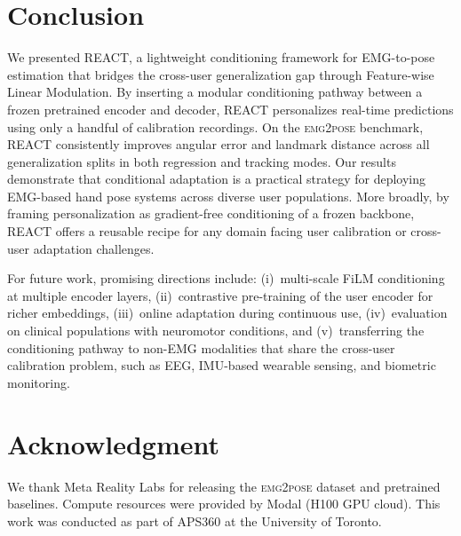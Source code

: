 \documentclass[conference]{IEEEtran}
\begin{document}
\section{Conclusion}
\label{sec:conclusion}

We presented REACT, a lightweight conditioning framework for EMG-to-pose estimation that bridges the cross-user generalization gap through Feature-wise Linear Modulation. By inserting a modular conditioning pathway between a frozen pretrained encoder and decoder, REACT personalizes real-time predictions using only a handful of calibration recordings. On the \textsc{emg2pose} benchmark, REACT consistently improves angular error and landmark distance across all generalization splits in both regression and tracking modes. Our results demonstrate that conditional adaptation is a practical strategy for deploying EMG-based hand pose systems across diverse user populations. More broadly, by framing personalization as gradient-free conditioning of a frozen backbone, REACT offers a reusable recipe for any domain facing user calibration or cross-user adaptation challenges.

For future work, promising directions include: (i)~multi-scale FiLM conditioning at multiple encoder layers, (ii)~contrastive pre-training of the user encoder for richer embeddings, (iii)~online adaptation during continuous use, (iv)~evaluation on clinical populations with neuromotor conditions, and (v)~transferring the conditioning pathway to non-EMG modalities that share the cross-user calibration problem, such as EEG, IMU-based wearable sensing, and biometric monitoring.

\section*{Acknowledgment}

We thank Meta Reality Labs for releasing the \textsc{emg2pose} dataset and pretrained baselines. Compute resources were provided by Modal (H100 GPU cloud). This work was conducted as part of APS360 at the University of Toronto.
\end{document}
